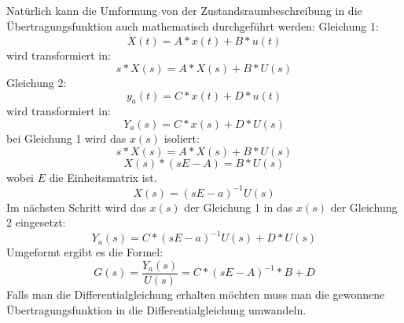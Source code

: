 Natürlich kann die Umformung von der Zustandsraumbeschreibung in die Übertragungsfunktion auch mathematisch durchgeführt werden:
Gleichung 1:
\begin{equation}
	\dot{X}(t)=A*x(t)+B*u(t)
\end{equation}
wird transformiert in:
\begin{equation}
	s*X(s)=A*X(s)+B*U(s)
\end{equation}
Gleichung 2:
\begin{equation}
	y_{a}(t)=C*x(t)+D*u(t)
\end{equation}
wird transformiert in:
\begin{equation}
	Y_{a}(s)=C*x(s)+D*U(s)
\end{equation}
bei Gleichung 1 wird  das $x(s)$ isoliert:
\begin{equation}
	s*X(s)=A*X(s)+B*U(s)
\end{equation}
\begin{equation}
	X(s)*(sE-A)=B*U(s)
\end{equation}
wobei $E$ die Einheitsmatrix ist.
\begin{equation}
	X(s)=(sE-a)^{-1}U(s)
\end{equation}
Im nächsten Schritt wird das $x(s)$ der Gleichung 1 in das $x(s)$ der Gleichung 2 eingesetzt:
\begin{equation}
	Y_{a}(s)=C*(sE-a)^{-1}U(s)+D*U(s)
\end{equation}
Umgeformt ergibt es die Formel:
\begin{equation}
	G(s)=\frac{Y_{a}(s)}{U(s)}=C*(sE-A)^{-1}*B+D
\end{equation}
Falls man die Differentialgleichung erhalten möchten muss man die gewonnene Übertragungsfunktion in die Differentialgleichung umwandeln.
